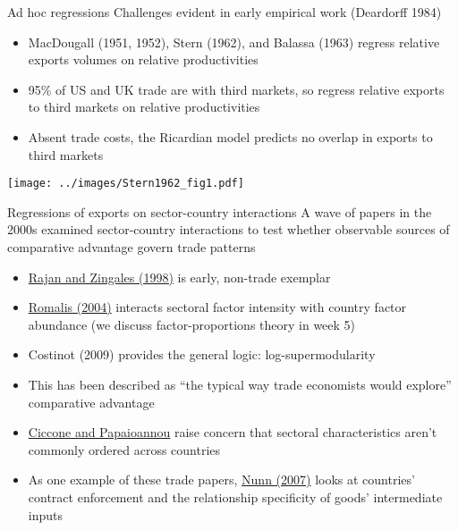 \documentclass[10pt,notes=hide]{beamer}
\begin{document}
\begin{frame}{Ad hoc regressions}
Challenges evident in early empirical work (Deardorff 1984)
\begin{itemize}
	\item MacDougall (1951, 1952), Stern (1962), and Balassa (1963) regress relative exports volumes on relative productivities
	\item 95\% of US and UK trade are with third markets, so regress relative exports to third markets on relative productivities
	\item Absent trade costs, the Ricardian model predicts no overlap in exports to third markets
\end{itemize}
\begin{center}
\texttt{[image: ../images/Stern1962\_fig1.pdf]}
\end{center}
\end{frame}
\begin{frame}{Regressions of exports on sector-country interactions}
A wave of papers in the 2000s examined sector-country interactions to test 
whether observable sources of comparative advantage govern trade patterns
\begin{itemize}
	\item \href{https://ideas.repec.org/a/aea/aecrev/v88y1998i3p559-86.html}{Rajan and Zingales (1998)} is early, non-trade exemplar
	\item \href{https://www.aeaweb.org/articles?id=10.1257/000282804322970715}{Romalis (2004)} interacts sectoral factor intensity with country factor abundance (we discuss factor-proportions theory in week 5)
	\item Costinot (2009) provides the general logic: log-supermodularity
	\item This has been described as ``the typical way trade economists would explore'' comparative advantage
	\item \href{https://www.nber.org/papers/w22368}{Ciccone and Papaioannou} raise concern that sectoral characteristics aren't commonly ordered across countries
	\item As one example of these trade papers, \href{https://academic.oup.com/qje/article/122/2/569/1942086}{Nunn (2007)} looks at countries' contract enforcement and the relationship specificity of goods' intermediate inputs
\end{itemize}
\end{frame}
\end{document}
